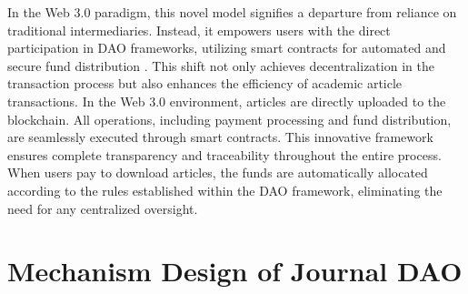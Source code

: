 \documentclass[lettersize,journal]{IEEEtran}
\begin{document}
In the Web 3.0 paradigm, this novel model signifies a departure from reliance on traditional intermediaries. Instead, it empowers users with the direct participation in DAO frameworks, utilizing smart contracts for automated and secure fund distribution \cite{10302435}. This shift not only achieves decentralization in the transaction process but also enhances the efficiency of academic article transactions.
In the Web 3.0 environment, articles are directly uploaded to the blockchain. All operations, including payment processing and fund distribution, are seamlessly executed through smart contracts. This innovative framework ensures complete transparency and traceability throughout the entire process. When users pay to download articles, the funds are automatically allocated according to the rules established within the DAO framework, eliminating the need for any centralized oversight.
  
\section{Mechanism Design of Journal DAO \label{sec:mechanism}}

\end{document}

